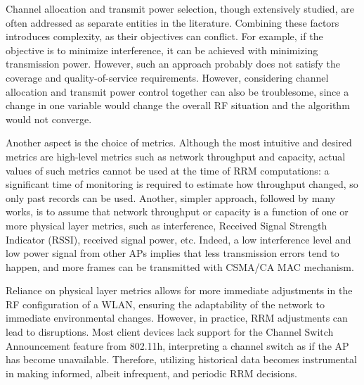 Channel allocation and transmit power selection, though extensively studied, are often addressed as separate entities in the literature. Combining these factors introduces complexity, as their objectives can conflict. For example, if the objective is to minimize interference, it can be achieved with minimizing transmission power. However, such an approach probably does not satisfy the coverage and quality-of-service requirements. However, considering channel allocation and transmit power control together can also be troublesome, since a change in one variable would change the overall RF situation and the algorithm would not converge.

Another aspect is the choice of metrics. Although the most intuitive and desired metrics are high-level metrics such as network throughput and capacity, actual values of such metrics cannot be used at the time of RRM computations: a significant time of monitoring is required to estimate how throughput changed, so only past records can be used. Another, simpler approach, followed by many works, is to assume that network throughput or capacity is a function of one or more physical layer metrics, such as interference, Received Signal Strength Indicator (RSSI), received signal power, etc. Indeed, a low interference level and low power signal from other APs implies that less transmission errors tend to happen, and more frames can be transmitted with CSMA/CA MAC mechanism.

Reliance on physical layer metrics allows for more immediate adjustments in the RF configuration of a WLAN, ensuring the adaptability of the network to immediate environmental changes.
However, in practice, RRM adjustments can lead to disruptions. Most client devices lack support for the Channel Switch Announcement feature from 802.11h, interpreting a channel switch as if the AP has become unavailable. Therefore, utilizing historical data becomes instrumental in making informed, albeit infrequent, and periodic RRM decisions.

